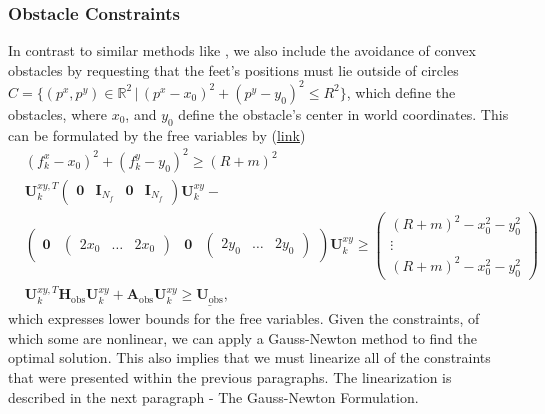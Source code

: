 \subsubsection{Obstacle Constraints}
In contrast to similar methods like \cite{herdt2010walking}, we also include the avoidance of convex obstacles by requesting that the feet's positions must lie outside of circles $C = \{(p^x, p^y)\in\mathbb{R}^2 \,|\, (p^x-x_0)^2+(p^y-y_0)^2\leq R^2\}$, which define the obstacles, where $x_0$, and $y_0$ define the obstacle's center in world coordinates. This can be formulated by the free variables by (\href{https://github.com/mhubii/nmpc_pattern_generator/blob/dc1f5a9366cbbbf76f1b02cada642f6ac9a04c89/libs/pattern_generator/src/base_generator.cpp#L1271}{\underline{link}})
\begin{align}
	&(f_k^x-x_0)^2 + (f_k^y-y_0)^2 \geq (R + m)^2
	\label{eq::212_obstacle}\\
	&\bm{U}_k^{xy,T}\begin{pmatrix}
	\bm{0} & \textbf{I}_{N_f} & \bm{0}& \textbf{I}_{N_f}
	\end{pmatrix}\bm{U}_k^{xy} - \\&\begin{pmatrix}
	\bm{0} & \begin{pmatrix}
	2x_0 & \dots & 2x_0
	\end{pmatrix} & \bm{0} & \begin{pmatrix}
	2y_0 & \dots & 2y_0
	\end{pmatrix}
	\end{pmatrix} \bm{U}_k^{xy}\geq \begin{pmatrix}
	(R + m)^2-x_0^2-y_0^2 \\
	\vdots \\
	(R + m)^2-x_0^2-y_0^2
	\end{pmatrix}\\
	&\bm{U}_k^{xy,T}\bm{H}_{\text{obs}}\bm{U}_k^{xy}+\bm{A}_{\text{obs}}\bm{U}_k^{xy} \geq \underline{\bm{U}_{\text{obs}}},
\end{align}
which expresses lower bounds for the free variables. Given the constraints, of which some are nonlinear, we can apply a Gauss-Newton method to find the optimal solution. This also implies that we must linearize all of the constraints that were presented within the previous paragraphs. The linearization is described in the next paragraph - The Gauss-Newton Formulation.
\FloatBarrier
